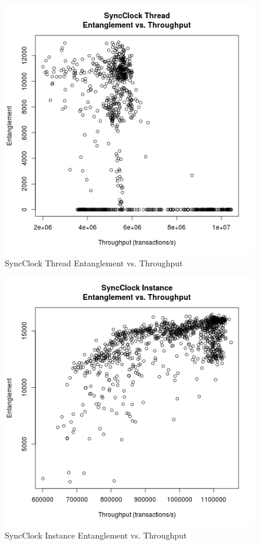 \begin{figure}[H]
\center
\includegraphics[height=.4\textheight]{sync_thread_throughput_entanglement.png}
\caption{SyncClock Thread Entanglement vs. Throughput}
\label{sync_thread_throughput_entanglement}
\end{figure}

\begin{figure}[H]
\center
\includegraphics[height=.4\textheight]{sync_instance_throughput_entanglement.png}
\caption{SyncClock Instance Entanglement vs. Throughput}
\label{sync_instance_throughput_entanglement}
\end{figure}

